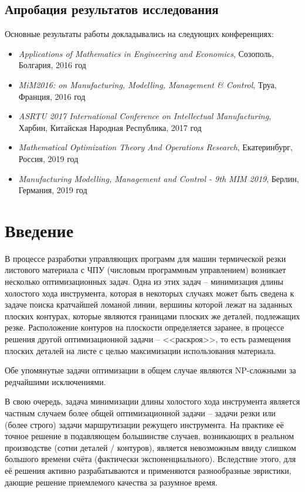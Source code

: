 \documentclass[14pt]{extarticle}
\theoremstyle{plain}%
\theoremstyle{remark}
\begin{document}
\subsection*{Апробация результатов исследования}

Основные результаты работы докладывались на
следующих конференциях:

\begin{itemize}
  \item
  \textit{Applications of Mathematics in Engineering and Economics},
  Созополь, Болгария, 2016 год
  \item
  \textit{MiM2016: on Manufacturing, Modelling, Management \& Control},
  Труа, Франция, 2016 год
  \item
  \textit{ASRTU 2017 International Conference on Intellectual Manufacturing},
  Харбин, Китайская Народная Республика, 2017 год
  \item
  \textit{Mathematical Optimization Theory And Operations Research},
  Екатеринбург, Россия, 2019 год
  \item
  \textit{Manufacturing Modelling, Management and Control - 9th MIM 2019},
  Берлин, Германия, 2019 год
\end{itemize}

\section{Введение}

В процессе разработки управляющих программ
для машин термической резки
листового материала с ЧПУ
(числовым программным управлением)
возникает несколько оптимизационных задач.
Одна из этих задач --
минимизация длины холостого хода инструмента,
которая в некоторых случаях может
быть сведена к задаче поиска кратчайшей
ломаной линии,
вершины которой лежат на заданных плоских контурах,
которые являются границами плоских же деталей,
подлежащих резке.
Расположение контуров на плоскости
определяется заранее,
в процессе решения другой оптимизационной задачи --
<<раскроя>>,
то есть размещения плоских деталей на листе
с целью максимизации использования материала.

Обе упомянутые задачи оптимизации
в общем случае являются
NP-сложными
за редчайшими исключениями.

В свою очередь,
задача минимизации длины холостого хода инструмента
является частным случаем более общей оптимизационной задачи --
задачи резки или
(более строго)
задачи маршрутизации режущего инструмента.
На практике её точное решение
в подавляющем большинстве случаев,
возникающих в реальном производстве
(сотни деталей / контуров),
является невозможным ввиду
слишком большого времени счёта
(фактически экспоненциального).
Вследствие этого,
для её решения
активно разрабатываются и применяются
разнообразные эвристики,
дающие решение приемлемого
качества за разумное время.
\end{document}
